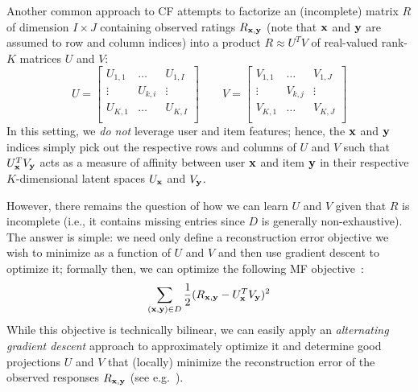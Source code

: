 Another common approach to CF attempts to factorize an (incomplete)
matrix $R$ of dimension $I \times J$ containing observed ratings $R_{\mathbf{x},\mathbf{y}}$ 
(note that $\mathbf{x}$ and $\mathbf{y}$ are assumed to row and column indices)
into a product $R \approx U^T V$ of real-valued
rank-$K$ matrices $U$ and $V$:
\begin{equation*}
U = 
\begin{bmatrix}
  U_{1,1} & \hdots  & U_{1,I} \\
  \vdots  & U_{k,i} & \vdots  \\
  U_{K,1} & \hdots  & U_{K,I} \\
\end{bmatrix}
\qquad 
V = 
\begin{bmatrix}
  V_{1,1} & \hdots  & V_{1,J} \\
  \vdots  & V_{k,j} & \vdots  \\
  V_{K,1} & \hdots  & V_{K,J} \\
\end{bmatrix}
\end{equation*}
In this setting, we \emph{do not} leverage user and item features;
hence, the $\mathbf{x}$ and $\mathbf{y}$ indices simply pick out the respective
rows and columns of $U$ and $V$ such that $U_{\mathbf{x}}^T V_{\mathbf{y}}$ acts as a
measure of affinity between user $\mathbf{x}$ and item $\mathbf{y}$ in their respective %
$K$-dimensional latent spaces $U_{\mathbf{x}}$ and $V_{\mathbf{y}}$.

However, there remains the question of how we can learn $U$ and $V$
given that $R$ is incomplete (i.e., it contains missing entries since
$D$ is generally non-exhaustive).  The answer is simple: we need only
define a reconstruction error objective we wish to minimize as a
function of $U$ and $V$ and then use gradient descent to optimize it;
formally then, we can optimize the following MF objective~\cite{pmf}:
\begin{align}
\sum_{(\mathbf{x},\mathbf{y}) \in D} \frac{1}{2} (R_{\mathbf{x},\mathbf{y}} - U_{\mathbf{x}}^T V_{\mathbf{y}})^2 \label{eq:basic_mf}
\end{align}
While this objective is technically bilinear, 
we can easily apply an
\emph{alternating gradient descent} approach to approximately
optimize it and determine good projections $U$ and
$V$ that (locally) minimize the reconstruction error of the observed
responses $R_{\mathbf{x},\mathbf{y}}$ (see e.g.~\cite{pmf}). %

